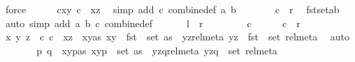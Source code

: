 \begin{isabellebody}
\ force\isanewline
\ \ \ \ \isamarkupfalse%
\ c{\isacharunderscore}{\kern0pt}xy{\isacharcolon}{\kern0pt}\ {\isachardoublequoteopen}c\ {\isacharequal}{\kern0pt}\ {\isacharparenleft}{\kern0pt}x{\isacharcomma}{\kern0pt}z{\isacharparenright}{\kern0pt}{\isachardoublequoteclose}\ \isamarkupfalse%
\ {\isacharparenleft}{\kern0pt}simp\ add{\isacharcolon}{\kern0pt}\ c\ combine{\isacharunderscore}{\kern0pt}def\ a\ b{\isacharparenright}{\kern0pt}\isanewline
\ \ \ \ \isamarkupfalse%
\ \isamarkupfalse%
\ {\isachardoublequoteopen}c\ {\isasymin}\ {\isacharquery}{\kern0pt}r{\isachardoublequoteclose}\ \isamarkupfalse%
\ fst{\isacharunderscore}{\kern0pt}set{\isacharunderscore}{\kern0pt}ab\ \isamarkupfalse%
\ {\isacharparenleft}{\kern0pt}auto\ simp\ add{\isacharcolon}{\kern0pt}\ a\ b\ c\ combine{\isacharunderscore}{\kern0pt}def{\isacharparenright}{\kern0pt}\isanewline
\ \ \isamarkupfalse%
\isanewline
\ \ \isamarkupfalse%
\ {\isachardoublequoteopen}{\isacharquery}{\kern0pt}l\ {\isasymsupseteq}\ {\isacharquery}{\kern0pt}r{\isachardoublequoteclose}\isanewline
\ \ \isamarkupfalse%
\isanewline
\ \ \ \ \isamarkupfalse%
\ c\isanewline
\ \ \ \ \isamarkupfalse%
\ {\isachardoublequoteopen}c\ {\isasymin}\ {\isacharquery}{\kern0pt}r{\isachardoublequoteclose}\isanewline
\ \ \ \ \isamarkupfalse%
\ \isamarkupfalse%
\ x\ y\ z\ \ c{\isacharcolon}{\kern0pt}\ {\isachardoublequoteopen}c\ {\isacharequal}{\kern0pt}\ {\isacharparenleft}{\kern0pt}x{\isacharcomma}{\kern0pt}z{\isacharparenright}{\kern0pt}{\isachardoublequoteclose}\ \ xy{\isacharunderscore}{\kern0pt}as{\isacharcolon}{\kern0pt}\ {\isachardoublequoteopen}{\isacharparenleft}{\kern0pt}x{\isacharcomma}{\kern0pt}y{\isacharparenright}{\kern0pt}\ {\isasymin}\ fst\ {\isacharbackquote}{\kern0pt}\ set\ as{\isachardoublequoteclose}\ \ yz{\isacharunderscore}{\kern0pt}rel{\isacharunderscore}{\kern0pt}meta{\isacharcolon}{\kern0pt}\ {\isachardoublequoteopen}{\isacharparenleft}{\kern0pt}y{\isacharcomma}{\kern0pt}z{\isacharparenright}{\kern0pt}\ {\isasymin}\ fst\ {\isacharbackquote}{\kern0pt}\ set\ rel{\isacharunderscore}{\kern0pt}meta{\isachardoublequoteclose}\ \isamarkupfalse%
\ auto\isanewline
\ \ \ \ \isamarkupfalse%
\ \isamarkupfalse%
\ p\ q\ \ xy{\isacharunderscore}{\kern0pt}p{\isacharunderscore}{\kern0pt}as{\isacharcolon}{\kern0pt}\ {\isachardoublequoteopen}{\isacharparenleft}{\kern0pt}{\isacharparenleft}{\kern0pt}x{\isacharcomma}{\kern0pt}y{\isacharparenright}{\kern0pt}{\isacharcomma}{\kern0pt}p{\isacharparenright}{\kern0pt}\ {\isasymin}\ set\ as{\isachardoublequoteclose}\ \ yz{\isacharunderscore}{\kern0pt}q{\isacharunderscore}{\kern0pt}rel{\isacharunderscore}{\kern0pt}meta{\isacharcolon}{\kern0pt}\ {\isachardoublequoteopen}{\isacharparenleft}{\kern0pt}{\isacharparenleft}{\kern0pt}y{\isacharcomma}{\kern0pt}z{\isacharparenright}{\kern0pt}{\isacharcomma}{\kern0pt}q{\isacharparenright}{\kern0pt}\ {\isasymin}\ set\ rel{\isacharunderscore}{\kern0pt}meta{\isachardoublequoteclose}\ \isamarkupfalse%

\end{isabellebody}
